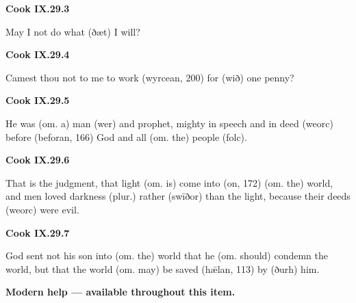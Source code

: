 \par\begin{minipage}{\linewidth}\raggedright
\textbf{Cook IX.29.3}

May I not do what (ðæt) I will?

\end{minipage}\par\addvspace{4pt}

\par\begin{minipage}{\linewidth}\raggedright
\textbf{Cook IX.29.4}

Camest thou not to me to work (wyrcean, 200) for (wið) one penny?

\end{minipage}\par\addvspace{4pt}

\par\begin{minipage}{\linewidth}\raggedright
\textbf{Cook IX.29.5}

He was (om. a) man (wer) and prophet, mighty in speech and in deed (weorc) before (beforan, 166) God and all (om. the) people (folc).

\end{minipage}\par\addvspace{4pt}

\par\begin{minipage}{\linewidth}\raggedright
\textbf{Cook IX.29.6}

That is the judgment, that light (om. is) come into (on, 172) (om. the) world, and men loved darkness (plur.) rather (swīðor) than the light, because their deeds (weorc) were evil.

\end{minipage}\par\addvspace{4pt}

\par\begin{minipage}{\linewidth}\raggedright
\textbf{Cook IX.29.7}

God sent not his son into (om. the) world that he (om. should) condemn the world, but that the world (om. may) be saved (hǣlan, 113) by (ðurh) him.

\textbf{Modern help — available throughout this item.}

\end{minipage}\par\addvspace{4pt}

